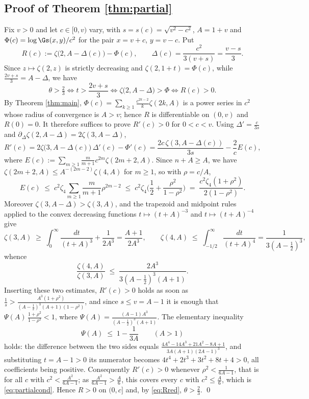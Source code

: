 \subsection{Proof of Theorem \ref{thm:partial}}
Fix $v>0$ and let $c\in[0,v)$ vary, with $s=s(c)=\sqrt{v^{2}-c^{2}}$, $A=1+v$ and
$\Phi(c)=\log\Gs(x,y)/c^{2}$ for the pair $x=v+c$, $y=v-c$. Put
\[
  R(c):=\zeta\big(2,A-\Delta(c)\big)-\Phi(c),\qquad \Delta(c)=\frac{c^{2}}{3(v+s)}=\frac{v-s}{3}.
\]
Since $z\mapsto\zeta(2,z)$ is strictly decreasing and $\zeta(2,1+t)=\Phi(c)$, while
$\frac{2v+s}{3}=A-\Delta$, we have
\begin{equation}\label{eq:Rred}
  \theta>\tfrac23\iff t>\frac{2v+s}{3}\iff\zeta\big(2,A-\Delta\big)>\Phi\iff R(c)>0 .
\end{equation}
By Theorem \ref{thm:main}, $\Phi(c)=\sum_{k\ge1}\frac{c^{2k-2}}{k}\zeta(2k,A)$ is a power
series in $c^{2}$ whose radius of convergence is $A>v$; hence $R$ is differentiable on
$(0,v)$ and $R(0)=0$. It therefore suffices to prove $R'(c)>0$ for $0<c<v$. Using
$\Delta'=\frac{c}{3s}$ and $\partial_{\Delta}\zeta(2,A-\Delta)=2\zeta(3,A-\Delta)$,
\[
  R'(c)=2\zeta\big(3,A-\Delta(c)\big)\,\Delta'(c)-\Phi'(c)
        =\frac{2c\,\zeta(3,A-\Delta(c))}{3s}-\frac{2}{c}E(c),
\]
where $E(c):=\sum_{m\ge1}\frac{m}{m+1}c^{2m}\zeta(2m+2,A)$.
Since $n+A\ge A$, we have $\zeta(2m+2,A)\le A^{-(2m-2)}\zeta(4,A)$ for $m\ge1$, so with
$\rho=c/A$,
\[
  E(c)\;\le\;c^{2}\zeta_{4}\sum_{m\ge1}\frac{m}{m+1}\rho^{2m-2}
  \;\le\;c^{2}\zeta_{4}\Big(\frac12+\frac{\rho^{2}}{1-\rho^{2}}\Big)
  \;=\;\frac{c^{2}\zeta_{4}(1+\rho^{2})}{2(1-\rho^{2})} .
\]
Moreover $\zeta(3,A-\Delta)>\zeta(3,A)$, and the trapezoid and midpoint rules applied to
the convex decreasing functions $t\mapsto(t+A)^{-3}$ and $t\mapsto(t+A)^{-4}$ give
\[
  \zeta(3,A)\;\ge\;\int_{0}^{\infty}\!\!\frac{dt}{(t+A)^{3}}+\frac{1}{2A^{3}}
   =\frac{A+1}{2A^{3}},\qquad
  \zeta(4,A)\;\le\;\int_{-1/2}^{\infty}\!\!\frac{dt}{(t+A)^{4}}
   =\frac{1}{3(A-\frac12)^{3}} ,
\]
whence
\begin{equation}\label{eq:ratio}
  \frac{\zeta(4,A)}{\zeta(3,A)}\;\le\;\frac{2A^{3}}{3(A-\frac12)^{3}(A+1)} .
\end{equation}
Inserting these two estimates, $R'(c)>0$ holds as soon as
$\frac1s>\frac{A^{3}(1+\rho^{2})}{(A-\frac12)^{3}(A+1)(1-\rho^{2})}$, and since $s\le v=A-1$
it is enough that $\Psi(A)\,\frac{1+\rho^{2}}{1-\rho^{2}}<1$, where
$\Psi(A)=\frac{(A-1)A^{3}}{(A-\frac12)^{3}(A+1)}$. The elementary inequality
\begin{equation}\label{eq:Psibnd}
  \Psi(A)\;\le\;1-\frac{1}{3A}\qquad(A>1)
\end{equation}
holds: the difference between the two sides equals
$\frac{4A^{4}-14A^{3}+21A^{2}-8A+1}{3A(A+1)(2A-1)^{3}}$, and substituting $t=A-1>0$ its
numerator becomes $4t^{4}+2t^{3}+3t^{2}+8t+4>0$, all coefficients being positive. Consequently $R'(c)>0$ whenever
$\rho^{2}<\frac{1}{6A-1}$, that is for all $c$ with $c^{2}<\frac{A^{2}}{6A-1}$; as
$\frac{A^{2}}{6A-1}>\frac A6$, this covers every $c$ with $c^{2}\le\frac A6$, which is
\eqref{eq:partialcond}. Hence $R>0$ on $(0,c]$ and, by \eqref{eq:Rred}, $\theta>\frac23$.
\qed

